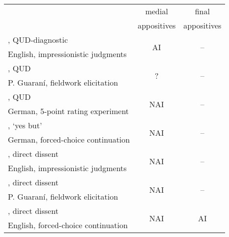 \documentclass[times,linguex,xcolor]{glossa}
\begin{document}
  


  \begin{tabular}{l c c}\toprule
                                    & medial         & final        \\
                                    & appositives    & appositives    \\\midrule
      \citealt{koev_notions_2018}, QUD-diagnostic 
                                    & \multirow{2}{*}{AI}
                                                    & \multirow{2}{*}{--} \\ 
      \scriptsize English, impressionistic judgments  &  \\ \midrule

      \citealt{tonhauser_diagnosing_2012}, QUD     & \multirow{2}{*}{?}
                                                    & \multirow{2}{*}{--} \\ 
      \scriptsize P. Guaraní, fieldwork elicitation  &  \\ \midrule

      \citealt{chen_presuppositions_2024}, QUD     & \multirow{2}{*}{NAI}
                                                    & \multirow{2}{*}{--} \\ 
      \scriptsize German, 5-point rating experiment  &  \\ \midrule

      \citealt{destruel_cross-linguistic_2015}, `yes but'     & \multirow{2}{*}{NAI}
                                                    & \multirow{2}{*}{--} \\ 
      \scriptsize German, forced-choice continuation  &  \\ \midrule

      \citealt{koev_notions_2018}, direct dissent     & \multirow{2}{*}{NAI}
                                                    & \multirow{2}{*}{--} \\ 
      \scriptsize English, impressionistic judgments  &  \\ \midrule

      \citealt{tonhauser_diagnosing_2012}, direct dissent     & \multirow{2}{*}{NAI}
                                                    & \multirow{2}{*}{--} \\ 
      \scriptsize P. Guaraní, fieldwork elicitation  &  \\ \midrule

      \citealt{syrett_experimental_2015}, direct dissent     & \multirow{2}{*}{NAI}
                                                    & \multirow{2}{*}{AI} \\ 
      \scriptsize English, forced-choice continuation  &  \\ \midrule

  \end{tabular}
\end{document}
